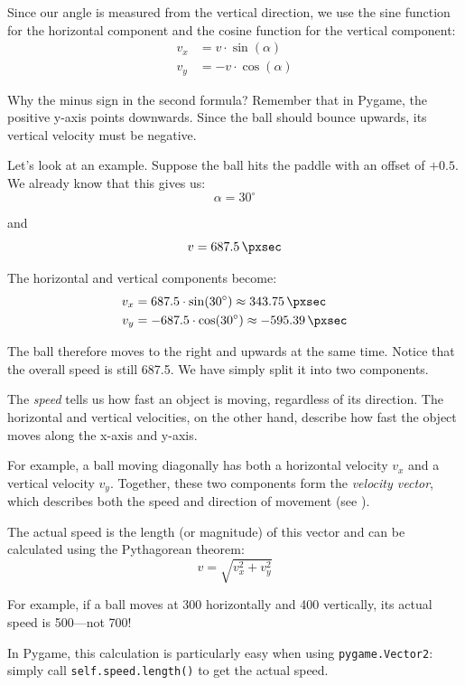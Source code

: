 Since our angle is measured from the vertical direction, we use the sine function for the horizontal component and the cosine function for the vertical component:
\begin{align}
	v_x & = v \cdot \sin(\alpha) \nonumber\\
	v_y & = -v \cdot \cos(\alpha) \nonumber
\end{align}

Why the minus sign in the second formula? Remember that in Pygame, the positive y-axis points downwards. Since the ball should bounce upwards, its vertical velocity must be negative.

Let's look at an example. Suppose the ball hits the paddle with an offset of $+0.5$. We already know that this gives us:
\[
	\alpha = 30^\circ
\]

and
\[
	v = \SI{687.5}{\pxsec}
\]

The horizontal and vertical components become:
\begin{align}
	v_x & = 687.5 \cdot \sin(30^\circ) \approx \SI{343.75}{\pxsec}\nonumber\\
	v_y & = -687.5 \cdot \cos(30^\circ) \approx \SI{-595.39}{\pxsec}\nonumber
\end{align}

The ball therefore moves to the right and upwards at the same time. Notice that the overall speed is still \SI{687.5}{\pxsec}. We have simply split it into two components.


\begin{hintbox}
	The \emph{speed} tells us how fast an object is moving, regardless of its direction. The horizontal and vertical velocities, on the other hand, describe how fast the object moves along the x-axis and y-axis.

	For example, a ball moving diagonally has both a horizontal velocity $v_x$ and a vertical velocity $v_y$. Together, these two components form the \emph{velocity vector}, which describes both the speed and direction of movement (see ).

	The actual speed is the length (or magnitude) of this vector and can be calculated using the Pythagorean theorem:
 	\[
 		v = \sqrt{v_x^2 + v_y^2}
 	\]

	For example, if a ball moves at \SI{300}{\pxsec} horizontally and \SI{400}{\pxsec} vertically, its actual speed is \SI{500}{\pxsec}---not \SI{700}{\pxsec}!

	In Pygame, this calculation is particularly easy when using \texttt{pygame.Vector2}: simply call \texttt{self.speed.length()} to get the actual speed.
\end{hintbox}

